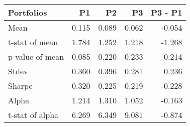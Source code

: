 \begin{tabular}{lrrrr}
\toprule
Portfolios & P1 & P2 & P3 & P3 - P1 \\
\midrule
Mean & 0.115 & 0.089 & 0.062 & -0.054 \\
t-stat of mean & 1.784 & 1.252 & 1.218 & -1.268 \\
p-value of mean & 0.085 & 0.220 & 0.233 & 0.214 \\
Stdev & 0.360 & 0.396 & 0.281 & 0.236 \\
Sharpe & 0.320 & 0.225 & 0.219 & -0.228 \\
Alpha & 1.214 & 1.310 & 1.052 & -0.163 \\
t-stat of alpha & 6.269 & 6.349 & 9.081 & -0.874 \\
\bottomrule
\end{tabular}
